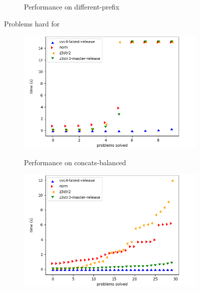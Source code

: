 \begin{figure}[h]
\begin{subfigure}{.5\textwidth}
            \vspace{-0.25in}
            \caption{Performance on different-prefix}
            \label{fig:different-prefix}
        \end{subfigure}
        \vspace{-0.1in}
        \caption{Problems hard for \cvc{}}
        \label{fig:cvc-hard}
        \vspace{-0.3in}
    \end{figure}

    \begin{figure}[h]
    \vspace{-0.25in}
        \begin{subfigure}{.5\textwidth}
            \includegraphics[width=\textwidth]{data/graphs/concats-balanced.png}
            \label{fig:concats-balanced}
            \vspace{-0.25in}
            \caption{Performance on concats-balanced}
        \end{subfigure}
        \begin{subfigure}{.5\textwidth}
            \includegraphics[width=\textwidth]{data/graphs/concats-small.png}

\end{subfigure}
\end{figure}
